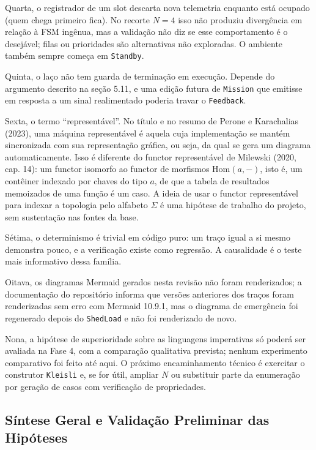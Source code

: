 \documentclass[12pt,a4paper]{article}
\begin{document}
Quarta, o registrador de um slot descarta nova telemetria enquanto está ocupado (quem chega primeiro fica). No recorte $N = 4$ isso não produziu divergência em relação à FSM ingênua, mas a validação não diz se esse comportamento é o desejável; filas ou prioridades são alternativas não exploradas. O ambiente também sempre começa em \texttt{Standby}.

Quinta, o laço não tem guarda de terminação em execução. Depende do argumento descrito na seção 5.11, e uma edição futura de \texttt{Mission} que emitisse em resposta a um sinal realimentado poderia travar o \texttt{Feedback}.

Sexta, o termo ``representável''. No título e no resumo de Perone e Karachalias (2023), uma máquina representável é aquela cuja implementação se mantém sincronizada com sua representação gráfica, ou seja, da qual se gera um diagrama automaticamente. Isso é diferente do functor representável de Milewski (2020, cap. 14): um functor isomorfo ao functor de morfismos $\mathrm{Hom}(a, -)$, isto é, um contêiner indexado por chaves do tipo $a$, de que a tabela de resultados memoizados de uma função é um caso. A ideia de usar o functor representável para indexar a topologia pelo alfabeto $\Sigma$ é uma hipótese de trabalho do projeto, sem sustentação nas fontes da base.

Sétima, o determinismo é trivial em código puro: um traço igual a si mesmo demonstra pouco, e a verificação existe como regressão. A causalidade é o teste mais informativo dessa família.

Oitava, os diagramas Mermaid gerados nesta revisão não foram renderizados; a documentação do repositório informa que versões anteriores dos traços foram renderizadas sem erro com Mermaid 10.9.1, mas o diagrama de emergência foi regenerado depois do \texttt{ShedLoad} e não foi renderizado de novo.

Nona, a hipótese de superioridade sobre as linguagens imperativas só poderá ser avaliada na Fase 4, com a comparação qualitativa prevista; nenhum experimento comparativo foi feito até aqui. O próximo encaminhamento técnico é exercitar o construtor \texttt{Kleisli} e, se for útil, ampliar $N$ ou substituir parte da enumeração por geração de casos com verificação de propriedades.

\subsection{Síntese Geral e Validação Preliminar das Hipóteses}
\end{document}

